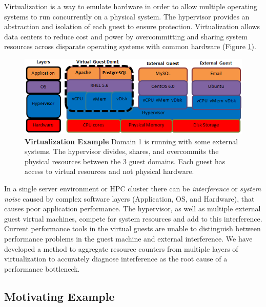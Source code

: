Virtualization is a way to emulate hardware in order to allow multiple operating systems to run concurrently on a physical system.  The hypervisor provides an abstraction and isolation of each guest to ensure protection. Virtualization allows data centers to reduce cost and power by overcommitting and sharing system resources across disparate operating systems with common hardware  (Figure \ref{virtStack}).

\begin{figure}[!h]
  \begin{center}
  \includegraphics[width=6in]{images/LayersAll.png}
  \caption{\textbf{Virtualization Example}  Domain 1 is running with some external systems.  The hypervisor  divides, shares, and overcommits the physical resources between the 3 guest domains.  Each guest has access to virtual resources and not physical hardware.}
  \label{virtStack}
  \end{center}
\end{figure}

In a single server environment or HPC cluster there can be \emph{interference} \cite{paul} or \emph{system noise}\cite{tsafrir} caused by complex software layers (Application, OS, and Hardware), that causes poor application performance.  
The hypervisor, as well as multiple external guest virtual machines, compete for system resources and add to this interference.  Current performance tools in the virtual guests are unable to distinguish between performance problems in the guest machine and external interference.  We have developed a method to aggregate resource counters from multiple layers of virtualization to accurately diagnose interference as the root cause of a performance bottleneck. 

\subsection{Motivating Example}


